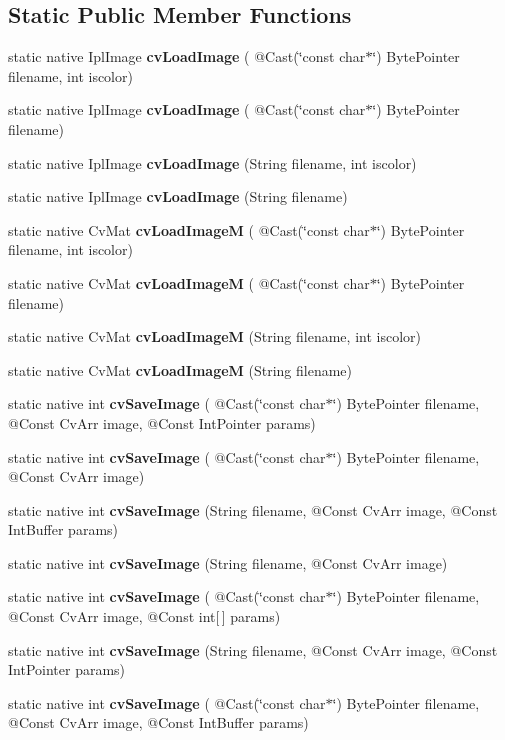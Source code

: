 \subsection*{Static Public Member Functions}
\begin{DoxyCompactItemize}
\item 
static native Ipl\+Image {\bfseries cv\+Load\+Image} ( @Cast(\char`\"{}const char$\ast$\char`\"{}) Byte\+Pointer filename, int iscolor)
\item 
static native Ipl\+Image {\bfseries cv\+Load\+Image} ( @Cast(\char`\"{}const char$\ast$\char`\"{}) Byte\+Pointer filename)
\item 
static native Ipl\+Image {\bfseries cv\+Load\+Image} (String filename, int iscolor)
\item 
static native Ipl\+Image {\bfseries cv\+Load\+Image} (String filename)
\item 
static native Cv\+Mat {\bfseries cv\+Load\+ImageM} ( @Cast(\char`\"{}const char$\ast$\char`\"{}) Byte\+Pointer filename, int iscolor)
\item 
static native Cv\+Mat {\bfseries cv\+Load\+ImageM} ( @Cast(\char`\"{}const char$\ast$\char`\"{}) Byte\+Pointer filename)
\item 
static native Cv\+Mat {\bfseries cv\+Load\+ImageM} (String filename, int iscolor)
\item 
static native Cv\+Mat {\bfseries cv\+Load\+ImageM} (String filename)
\item 
static native int {\bfseries cv\+Save\+Image} ( @Cast(\char`\"{}const char$\ast$\char`\"{}) Byte\+Pointer filename, @Const Cv\+Arr image, @Const Int\+Pointer params)
\item 
static native int {\bfseries cv\+Save\+Image} ( @Cast(\char`\"{}const char$\ast$\char`\"{}) Byte\+Pointer filename, @Const Cv\+Arr image)
\item 
static native int {\bfseries cv\+Save\+Image} (String filename, @Const Cv\+Arr image, @Const Int\+Buffer params)
\item 
static native int {\bfseries cv\+Save\+Image} (String filename, @Const Cv\+Arr image)
\item 
static native int {\bfseries cv\+Save\+Image} ( @Cast(\char`\"{}const char$\ast$\char`\"{}) Byte\+Pointer filename, @Const Cv\+Arr image, @Const int\mbox{[}$\,$\mbox{]} params)
\item 
static native int {\bfseries cv\+Save\+Image} (String filename, @Const Cv\+Arr image, @Const Int\+Pointer params)
\item 
static native int {\bfseries cv\+Save\+Image} ( @Cast(\char`\"{}const char$\ast$\char`\"{}) Byte\+Pointer filename, @Const Cv\+Arr image, @Const Int\+Buffer params)

\end{DoxyCompactItemize}
